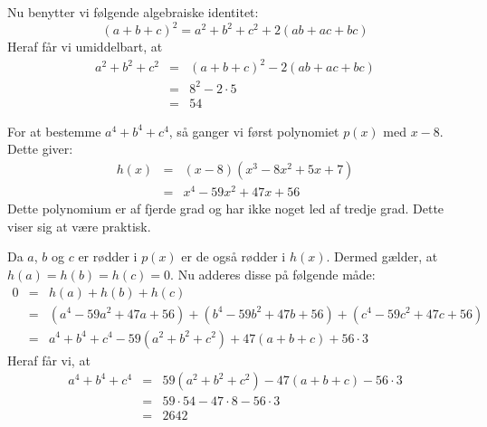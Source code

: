 \documentclass[12pt,oneside,a4paper]{article}
\newcommand{\bas}{\begin{eqnarray*}}
\newcommand{\eas}{\end{eqnarray*}}
\begin{document}
Nu benytter vi følgende algebraiske identitet:
$$
(a+b+c)^2 = a^2+b^2+c^2 + 2(ab+ac+bc)
$$
Heraf får vi umiddelbart, at
\bas
a^2+b^2+c^2 &=& (a+b+c)^2 - 2(ab+ac+bc) \\
            &=& 8^2 - 2\cdot 5 \\
            &=& 54
\eas

For at bestemme $a^4+b^4+c^4$, så ganger vi først polynomiet $p(x)$ med $x-8$. Dette giver:
\bas
h(x) &=& (x-8)(x^3-8x^2+5x+7) \\
     &=& x^4-59x^2+47x+56
\eas
Dette polynomium er af fjerde grad og har ikke noget led af tredje grad. Dette viser sig at være praktisk.

Da $a$, $b$ og $c$ er rødder i $p(x)$ er de også rødder i $h(x)$. Dermed gælder, at $h(a) = h(b) = h(c) = 0$. Nu adderes disse på følgende måde:
\bas
0 &=& h(a) + h(b) + h(c) \\
  &=& (a^4-59a^2+47a+56)
    + (b^4-59b^2+47b+56)
    + (c^4-59c^2+47c+56) \\
  &=& a^4+b^4+c^4 - 59(a^2+b^2+c^2) + 47(a+b+c) + 56\cdot 3 
\eas
Heraf får vi, at
\bas
a^4+b^4+c^4 &=& 59(a^2+b^2+c^2) - 47(a+b+c)-56\cdot 3 \\
            &=& 59\cdot 54 - 47\cdot 8 - 56\cdot 3 \\
            &=& 2642
\eas
\end{document}
